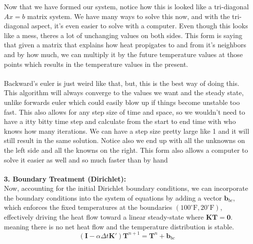 \documentclass[11pt]{article}
\begin{document}
\begin{onehalfspace}
    \noindent
    Now that we have formed our system, notice how this is looked like a tri-diagonal 
    $Ax=b$ matrix system. We have many ways to solve this now, and with the tri-diagonal aspect, 
    it's even easier to solve with a computer.
    Even though this looks like a mess, theres a lot of unchanging values on both sides.
    This form is saying that given a matrix that explains how heat propigates to and from
    it's neighbors and by how much, we can multiply it by the future temperature values at 
    those points which results in the temperature values in the present.
    \\\\
    Backward's euler is just weird like that, but, this is the best way of doing this.
    This algorithm will always converge to the values we want and the steady state,
    unlike forwards euler which could easily blow up if things become unstable too fast.
    This also allows for any step size of time and space, so we wouldn't need to have a itty
    bitty time step and calculate from the start to end time with who knows how many iterations.
    We can have a step size pretty large like 1 and it will still result in the same solution.
    Notice also we end up with all the unknowns on the left side and all the knowns on the right.
    This form also allows a computer to solve it easier as well and so much faster than by hand \\\\
    \noindent
    \textbf{3. Boundary Treatment (Dirichlet):} \\
    \noindent
    Now, accounting for the initial Dirichlet boundary conditions, we can incorporate the boundary conditions into the system of equations by adding a vector $\mathbf{b}_{bc}$, 
    which enforces the fixed temperatures at the boundaries $(100^\circ\text{F}, 20^\circ\text{F})$, effectively driving the heat flow toward a linear steady-state where $\mathbf{K}\mathbf{T} = \mathbf{0}$.
    meaning there is no net heat flow and the temperature distribution is stable.
    \[(\mathbf{I} - \alpha \Delta t \mathbf{K}') \mathbf{T}^{n+1} = \mathbf{T}^{n} + \mathbf{b}_{bc}\]
    

\end{onehalfspace}
\end{document}

